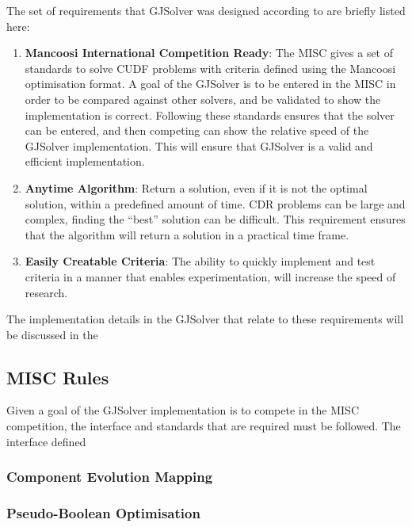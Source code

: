 The set of requirements that GJSolver was designed according to are briefly listed here:
\begin{enumerate}
  \item \textbf{Mancoosi International Competition Ready}: The MISC gives a set of standards to solve CUDF problems with criteria defined using the Mancoosi optimisation format.
  A goal of the GJSolver is to be entered in the MISC in order to be compared against other solvers, and be validated to show the implementation is correct.
  Following these standards ensures that the solver can be entered, and then competing can show the relative speed of the GJSolver implementation.
  This will ensure that GJSolver is a valid and efficient implementation. 
  \item \textbf{Anytime Algorithm}: Return a solution, even if it is not the optimal solution, within a predefined amount of time. 
  CDR problems can be large and complex, finding the ``best'' solution can be difficult. 
  This requirement ensures that the algorithm will return a solution in a practical time frame.
  \item \textbf{Easily Creatable Criteria}: The ability to quickly implement and test criteria in a manner that enables experimentation, will increase the speed of research.
\end{enumerate}

The implementation details in the GJSolver that relate to these requirements will be discussed in the 


\subsection{MISC Rules}
Given a goal of the GJSolver implementation is to compete in the MISC competition, the interface and standards that are required must be followed.
The interface defined  

\subsubsection{Component Evolution Mapping}

\subsubsection{Pseudo-Boolean Optimisation}


